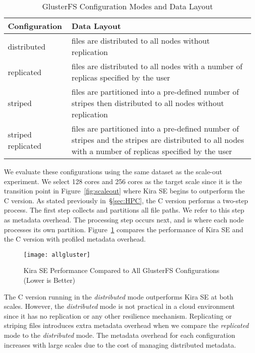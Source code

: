 \documentclass[conference]{IEEEtran}
\begin{document}
\begin{table}[h]
  \begin{center}
  \caption{GlusterFS Configuration Modes and Data Layout}
    \begin{small}
    \begin{tabular}{ | p{1.65cm} | p{6cm} |}
    \hline
    Configuration & Data Layout \\ \hline \hline
    distributed & files are distributed to all nodes without replication  \\ \hline
    replicated & files are distributed to all nodes with a number of replicas specified by the user \\ \hline  
    striped & files are partitioned into a pre-defined number of stripes then distributed to all nodes without replication \\ \hline
    striped replicated & files are partitioned into a pre-defined number of stripes and the stripes are distributed to all nodes with a number of replicas specified by the user \\ \hline
    \end{tabular}
    \end{small}   
  \label{tb:gluster-conf}     	
  \end{center}
\end{table}

We evaluate these configurations using the same dataset as the scale-out experiment. We
select 128 cores and 256 cores as the target scale since it is the transition point in
Figure~\ref{fig:scaleout} where Kira SE begins to outperform the C version. As stated
previously in~\S\ref{sec:HPC}, the C version performs a two-step process. The first step collects and
partitions all file paths. We refer to this step as metadata overhead. The processing
step occurs next, and is where each node processes its own partition.
Figure~\ref{fig:allgluster} compares the performance of Kira SE and the C version with
profiled metadata overhead.  

\begin{figure}[h]
	\begin{center}
		\texttt{[image: allgluster]}
		\caption{Kira SE Performance Compared to All GlusterFS Configurations (Lower is Better)
		\label{fig:allgluster}}
  	\end{center}
\end{figure}

The C version running in the \emph{distributed} mode outperforms Kira SE at both scales. 
However, the \emph{distributed} mode is not practical in a cloud environment since
it has no replication or any other resilience mechanism. Replicating or striping
files introduces extra metadata overhead when we compare the \emph{replicated} mode
to the \emph{distributed} mode. The metadata overhead for each configuration increases
with large scales due to the cost of managing distributed metadata.
\end{document}
